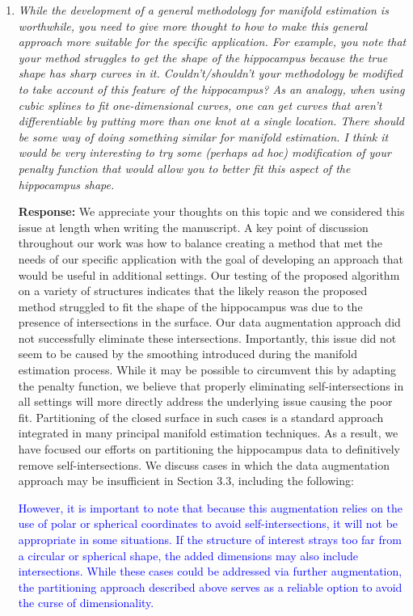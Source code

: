 \documentclass[12pt]{article}
\theoremstyle{definition}
\newcommand{\revision}[1]{\textcolor{blue}{#1}}
\begin{document}
\begin{enumerate}

\item {\it While the development of a general methodology for manifold estimation is worthwhile, you need to give more thought to how to make this general approach more suitable for the specific application. For example, you note that your method struggles to get the shape of the hippocampus because the true shape has sharp curves in it.  Couldn't/shouldn't your methodology be modified to take account of this feature of the hippocampus?  As an analogy, when using cubic splines to fit one-dimensional curves, one can get curves that aren't differentiable by putting more than one knot at a single location.  There should be some way of doing something similar for manifold estimation.  I think it would be very interesting to try some (perhaps ad hoc) modification of your penalty function that would allow you to better fit this aspect of the hippocampus shape.}

{\bf Response:}
We appreciate your thoughts on this topic and we considered this issue at length when writing the manuscript. A key point of discussion throughout our work was how to balance creating a method that met the needs of our specific application with the goal of developing an approach that would be useful in additional settings. Our testing of the proposed algorithm on a variety of structures indicates that the likely reason the proposed method struggled to fit the shape of the hippocampus was due to the presence of intersections in the surface. Our data augmentation approach did not successfully eliminate these intersections. Importantly, this issue did not seem to be caused by the smoothing introduced during the manifold estimation process. While it may be possible to circumvent this by adapting the penalty function, we believe that properly eliminating self-intersections in all settings will more directly address the underlying issue causing the poor fit. Partitioning of the closed surface in such cases is a standard approach integrated in many principal manifold estimation techniques. As a result, we have focused our efforts on partitioning the hippocampus data to definitively remove self-intersections. We discuss cases in which the data augmentation approach may be insufficient in Section 3.3, including the following:

\revision{However, it is important to note that because this augmentation relies on the use of polar or spherical coordinates to avoid self-intersections, it will not be appropriate in some situations. If the structure of interest strays too far from a circular or spherical shape, the added dimensions may also include intersections. While these cases could be addressed via further augmentation, the partitioning approach described above serves as a reliable option to avoid the curse of dimensionality.} 


\end{enumerate}
\end{document}
